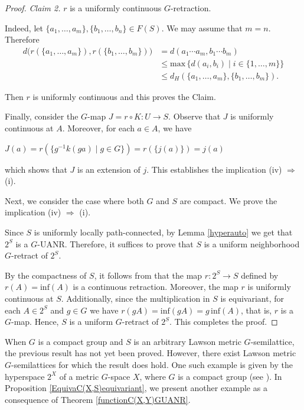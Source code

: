 \documentclass[12pt]{amsart}
\theoremstyle{definition}
\begin{document}
\begin{proof}
		\smallskip
		
		\noindent\textit{Claim 2.} $r$ is a  uniformly continuous      $G$-retraction.   
		
		Indeed, let $\{a_1,\dots,a_m\}, \{b_1,\dots,b_n\}\in F(S)$. We may assume that $m=n$. Therefore
		\begin{align*}
			d\big(r(\{a_1,\dots,a_m\}),r(\{b_1,\dots,b_m\})\big)& =d(a_1\cdots a_m,b_1\cdots b_m)\\
			& \leq \text{max}\, \{d(a_i,b_i)\mid i\in \{1,\dots,m\}\}\\
			& \leq d_H(\{a_1,\dots,a_m\},\{b_1,\dots,b_m\}).
		\end{align*} 
		
		Then $r$ is uniformly continuous and this proves the Claim.
		
		Finally, consider the $G$-map $J=r\circ K: U\rightarrow S$. Observe that $J$ is uniformly continuous at $A$. Moreover, for each $a\in A$, we have
		
		\begin{center}
			$J(a)=r(\{g^{-1} k(ga)\mid g\in G\})=r(\{j(a)\})=j(a)$
		\end{center}
		which shows that $J$ is an extension of $j$. This establishes the implication  (iv) $\Rightarrow$ (i).
		
		Next, we consider the case where both $G$ and $S$ are compact. We prove the implication  (iv) $\Rightarrow$ (i). 
		
		Since $S$ is uniformly locally path-connected, by Lemma \ref{hyperauto} we get that $2^S$ is a $G$-UANR. Therefore, it suffices to prove that $S$ is a uniform neighborhood $G$-retract of $2^S$.
		
		By the compactness of $S$, it follows from \cite{MMC} that the map $r: 2^S\rightarrow S$ defined by $r(A)=\mbox{inf}(A)$  is a continuous retraction. Moreover, the map $r$ is uniformly continuous at $S$.  Additionally, since the multiplication in $S$ is equivariant, for each $A\in 2^S$ and $g\in G$ we have $r(gA)=\mbox{inf}(gA)=g\, \mbox{inf}(A)$, that is, $r$ is a $G$-map. Hence, $S$ is a uniform $G$-retract of $2^S$. This completes the proof.

	\end{proof}
	
	When $G$ is a compact group and $S$ is an arbitrary Lawson metric $G$-semilattice, the previous result has not yet been proved. However, there exist Lawson metric $G$-semilattices for which the result does hold. One such example is given by the hyperspace $2^X$ of a metric $G$-space $X$, where $G$ is a compact group (see \cite{A10}). In Proposition \ref{EquivaC(X,S)equivariant}, we present another example as a consequence of Theorem \ref{functionC(X,Y)GUANR}.
	
\end{document}
